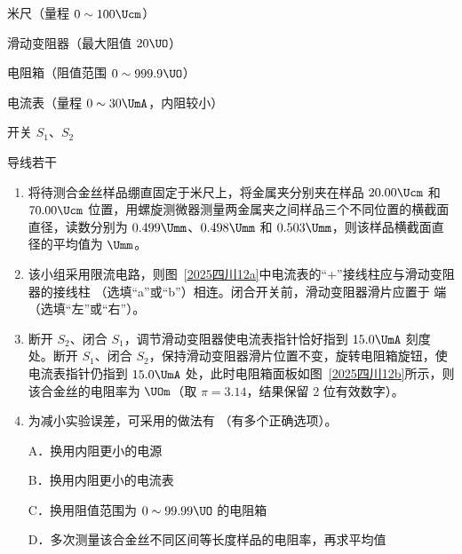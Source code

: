 \documentclass[\gkver]{gaokaozhenti}
\begin{document}
\begin{enumerate}
米尺（量程 $0 \sim 100 \Ucm$）

滑动变阻器（最大阻值 $20 \UO$）

电阻箱（阻值范围 $0 \sim 999.9 \UO$）

电流表（量程 $0 \sim 30 \UmA$，内阻较小）

开关 $S_{1}$、$S_{2}$

导线若干


\begin{enumerate}
	\item
	将待测合金丝样品绷直固定于米尺上，将金属夹分别夹在样品 $20.00 \Ucm$ 和 $70.00 \Ucm$ 位置，用螺旋测微器测量两金属夹之间样品三个不同位置的横截面直径，读数分别为 $0.499 \Umm$、$0.498 \Umm$ 和 $0.503 \Umm$，则该样品横截面直径的平均值为  $\Umm$。
	\item
	该小组采用限流电路，则图~\ref{2025四川12a}中电流表的“+”接线柱应与滑动变阻器的接线柱 （选填“a”或“b”）相连。闭合开关前，滑动变阻器滑片应置于  端（选填“左”或“右”）。
	\item
	断开 $S_{2}$、闭合 $S_{1}$，调节滑动变阻器使电流表指针恰好指到 $15.0 \UmA$ 刻度处。断开 $S_{1}$、闭合 $S_{2}$，保持滑动变阻器滑片位置不变，旋转电阻箱旋钮，使电流表指针仍指到 $15.0 \UmA$ 处，此时电阻箱面板如图~\ref{2025四川12b}所示，则该合金丝的电阻率为  $\UOm$（取 $\pi = 3.14$，结果保留 2 位有效数字）。
	\item
	为减小实验误差，可采用的做法有 （有多个正确选项）。

	A．换用内阻更小的电源

	B．换用内阻更小的电流表

	C．换用阻值范围为 $0 \sim 99.99 \UO$ 的电阻箱

	D．多次测量该合金丝不同区间等长度样品的电阻率，再求平均值
\end{enumerate}

\end{enumerate}
\end{document}
